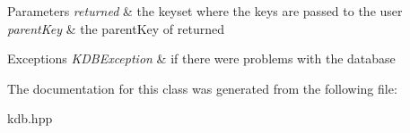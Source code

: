 \begin{DoxyParams}{Parameters}
{\em returned} & the keyset where the keys are passed to the user \\
\hline
{\em parent\-Key} & the parent\-Key of returned\\
\hline
\end{DoxyParams}

\begin{DoxyExceptions}{Exceptions}
{\em K\-D\-B\-Exception} & if there were problems with the database \\
\hline
\end{DoxyExceptions}


The documentation for this class was generated from the following file\-:\begin{DoxyCompactItemize}
\item 
kdb.\-hpp\end{DoxyCompactItemize}
